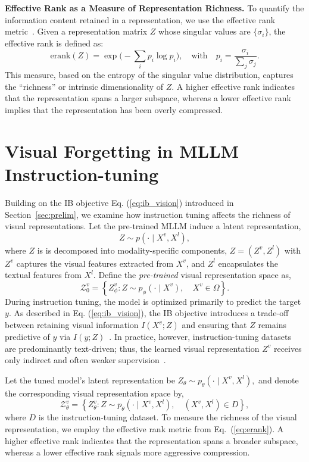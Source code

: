 \vspace{1em}\noindent\textbf{Effective Rank as a Measure of Representation Richness.}
To quantify the information content retained in a representation, we use the effective rank metric~\cite{roy2007effective}. Given a representation matrix \( Z \) whose singular values are \( \{\sigma_i\} \), the effective rank is defined as:
\begin{equation}\label{eq:erank}
    \text{erank}(Z) = \exp\Biggl(-\sum_{i} p_i \log p_i\Biggr), \quad \text{with} \quad p_i = \frac{\sigma_i}{\sum_j \sigma_j}.
\end{equation}
This measure, based on the entropy of the singular value distribution, captures the “richness” or intrinsic dimensionality of \( Z \). A higher effective rank indicates that the representation spans a larger subspace, whereas a lower effective rank implies that the representation has been overly compressed.




\section{Visual Forgetting in MLLM Instruction-tuning}\label{sec:visual_forget}
Building on the IB objective Eq. (\ref{eq:ib_vision}) introduced in Section~\ref{sec:prelim}, we examine how instruction tuning affects the richness of visual representations. 
Let the pre-trained MLLM induce a latent representation,  
$$Z \sim p(\cdot\mid X^v, X^l),$$
where $Z$ is is decomposed into modality-specific components, $Z = (Z^v, Z^l)$
with \( Z^v \) captures the visual features extracted from \( X^v \), and \( Z^l \) encapsulates the textual features from \( X^l \).
Define the \emph{pre-trained} visual representation space as,
\[
\mathcal{Z}_0^v = \left\{ Z^v_\phi : Z \sim p_\phi(\cdot \mid X^v), \quad X^v \in \Omega \right\}.
\]
During instruction tuning, the model is optimized primarily to predict the target $y$. As described in Eq. (\ref{eq:ib_vision}), the IB objective introduces a trade-off between retaining visual information \( I(X^v; Z) \) and ensuring that \( Z \) remains predictive of \( y \) via \( I(y; Z) \)~\cite{jiang2024correlation}. 
In practice, however, instruction-tuning datasets are predominantly text-driven; thus, the learned visual representation $Z^v$ receives only indirect and often weaker supervision~\cite{wang2024mdpo}.

Let the tuned model’s latent representation be $Z_\theta \sim p_\theta(\cdot\mid X^v, X^l),$
and denote the corresponding visual representation space by,
\[
\mathcal{Z}_\theta^v = \left\{ Z^v_\theta : Z \sim p_\theta(\cdot\mid X^v, X^l), \quad (X^v, X^l) \in D \right\},
\]
where \( D \) is the instruction-tuning dataset.
To measure the richness of the visual representation, we employ the effective rank metric from Eq.~(\ref{eq:erank}). 
A higher effective rank indicates that the representation spans a broader subspace, whereas a lower effective rank signals more aggressive compression.  

